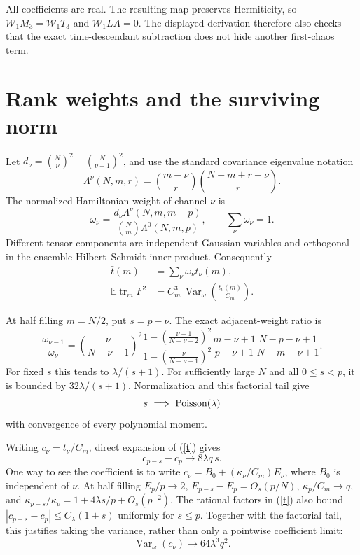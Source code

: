\documentclass[11pt,a4paper]{article}
\newcommand{\W}{\mathcal W}
\begin{document}
All coefficients are real. The resulting map preserves Hermiticity,
so $\W_1M_3=\W_1T_3$ and $\W_1LA=0$. The displayed derivation
therefore also checks that the exact time-descendant subtraction
does not hide another first-chaos term.

\newpage
\section{Rank weights and the surviving norm}
Let $d_\nu=\binom N\nu^2-\binom N{\nu-1}^2$, and use the
standard covariance eigenvalue notation \cite{Kota}
\[
 \Lambda^\nu(N,m,r)=\binom{m-\nu}{r}
                         \binom{N-m+r-\nu}{r}.
\]
The normalized Hamiltonian weight of channel $\nu$ is
\begin{equation}
 \omega_\nu=
 \frac{d_\nu\Lambda^\nu(N,m,m-p)}
      {\binom Nm\Lambda^0(N,m,p)},\qquad \sum_\nu\omega_\nu=1 .
\end{equation}
Different tensor components are independent Gaussian variables
and orthogonal in the ensemble Hilbert--Schmidt inner product.
Consequently
\begin{align}
 \bar t(m)&=\sum_\nu\omega_\nu t_\nu(m),\\
 \mathbb E\operatorname{tr}_m F^2
 &=C_m^3\,\operatorname{Var}_{\omega}
          \left(\frac{t_\nu(m)}{C_m}\right).           \label{variance}
\end{align}

At half filling $m=N/2$, put $s=p-\nu$. The exact adjacent-weight
ratio is
\begin{equation}
 \frac{\omega_{\nu-1}}{\omega_\nu}
 =\left(\frac{\nu}{N-\nu+1}\right)^2
 \frac{1-\left(\frac{\nu-1}{N-\nu+2}\right)^2}
      {1-\left(\frac{\nu}{N-\nu+1}\right)^2}
 \frac{m-\nu+1}{p-\nu+1}
 \frac{N-p-\nu+1}{N-m-\nu+1}.                         \label{ratio}
\end{equation}
For fixed $s$ this tends to $\lambda/(s+1)$. For sufficiently
large $N$ and all $0\le s<p$, it is bounded by
$32\lambda/(s+1)$. Normalization and this factorial tail give
\begin{equation}
 s\ \Longrightarrow\ {\rm Poisson}(\lambda)
\end{equation}
with convergence of every polynomial moment.

Writing $c_\nu=t_\nu/C_m$, direct expansion of (\ref{t}) gives
\begin{equation}
 c_{p-s}-c_p\longrightarrow 8\lambda q\,s.             \label{slope}
\end{equation}
One way to see the coefficient is to write $c_\nu=B_0+
(\kappa_\nu/C_m)E_\nu$, where $B_0$ is independent of $\nu$.
At half filling
$E_p/p\to2$, $E_{p-s}-E_p=O_s(p/N)$,
$\kappa_p/C_m\to q$, and
$\kappa_{p-s}/\kappa_p=1+4\lambda s/p+O_s(p^{-2})$.
The rational factors in (\ref{t}) also bound
$|c_{p-s}-c_p|\le C_\lambda(1+s)$ uniformly for $s\le p$.
Together with the factorial tail, this justifies taking the
variance, rather than only a pointwise coefficient limit:
\begin{equation}
 \operatorname{Var}_\omega(c_\nu)\longrightarrow
                  64\lambda^3q^2 .                  \label{varlimit}
\end{equation}
\end{document}
